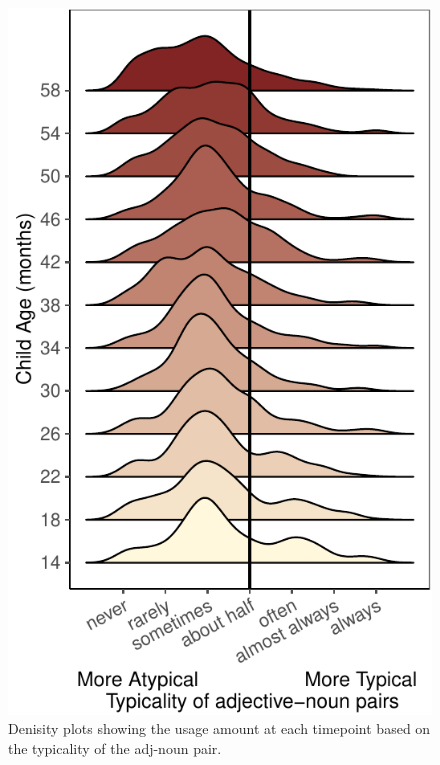 \documentclass[10pt, letterpaper]{article}
\newenvironment{CodeChunk}{}{}
\begin{document}
\begin{CodeChunk}
\begin{figure}[tb]

{\centering \includegraphics{figs/distribution_plot-1} 

}

\caption[Denisity plots showing the usage amount at each timepoint based on the typicality of the adj-noun pair]{Denisity plots showing the usage amount at each timepoint based on the typicality of the adj-noun pair.}\label{fig:distribution_plot}
\end{figure}
\end{CodeChunk}
\end{document}
